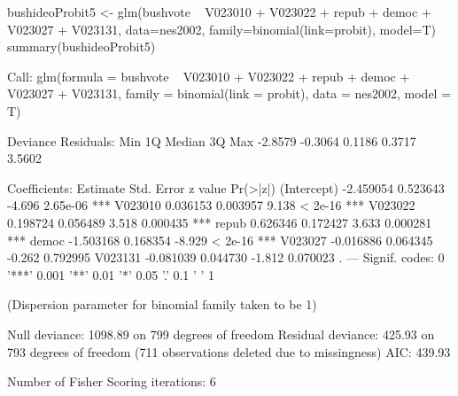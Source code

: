 \begin{Schunk}
\begin{Sinput}
 bushideoProbit5 <- glm(bushvote ~ V023010 + V023022 + repub + democ + V023027 + V023131, data=nes2002, family=binomial(link=probit), model=T)
 summary(bushideoProbit5)
\end{Sinput}
\begin{Soutput}
Call:
glm(formula = bushvote ~ V023010 + V023022 + repub + democ + 
    V023027 + V023131, family = binomial(link = probit), data = nes2002, 
    model = T)

Deviance Residuals: 
    Min       1Q   Median       3Q      Max  
-2.8579  -0.3064   0.1186   0.3717   3.5602  

Coefficients:
             Estimate Std. Error z value Pr(>|z|)    
(Intercept) -2.459054   0.523643  -4.696 2.65e-06 ***
V023010      0.036153   0.003957   9.138  < 2e-16 ***
V023022      0.198724   0.056489   3.518 0.000435 ***
repub        0.626346   0.172427   3.633 0.000281 ***
democ       -1.503168   0.168354  -8.929  < 2e-16 ***
V023027     -0.016886   0.064345  -0.262 0.792995    
V023131     -0.081039   0.044730  -1.812 0.070023 .  
---
Signif. codes:  0 '***' 0.001 '**' 0.01 '*' 0.05 '.' 0.1 ' ' 1

(Dispersion parameter for binomial family taken to be 1)

    Null deviance: 1098.89  on 799  degrees of freedom
Residual deviance:  425.93  on 793  degrees of freedom
  (711 observations deleted due to missingness)
AIC: 439.93

Number of Fisher Scoring iterations: 6
\end{Soutput}
\end{Schunk}
